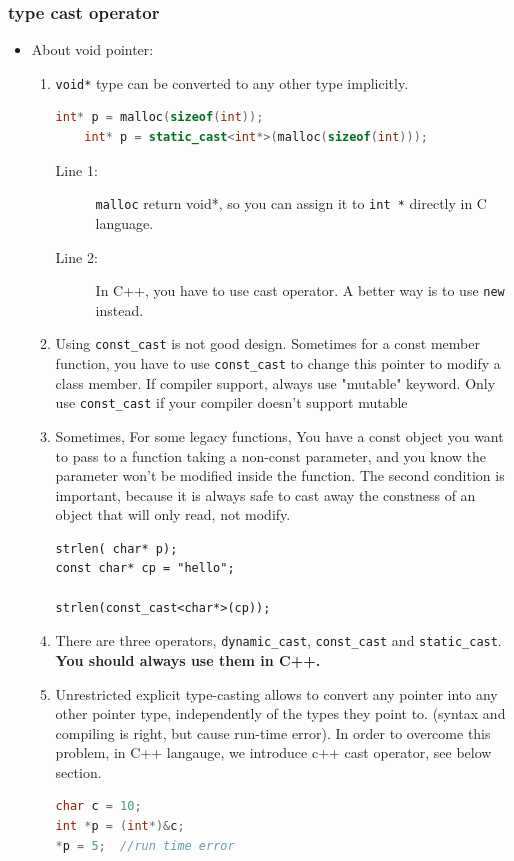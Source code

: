 \documentclass[a4paper,11pt,twoside]{book}
\begin{document}
\subsubsection{type cast operator}
\begin{itemize}
	\item About void pointer:
	\begin{enumerate}
		\item \texttt{void*} type can be converted to any other type implicitly.
\begin{lstlisting}[frame=single, language=c++]
	int* p = malloc(sizeof(int));
	int* p = static_cast<int*>(malloc(sizeof(int)));
\end{lstlisting}		
		\begin{description}
			\item[Line 1:] \texttt{malloc} return void*, so you can assign it to \texttt{int *} directly in C language.
			\item[Line 2:] In C++, you have to use cast operator. A better way is to use \texttt{new} instead.
		\end{description}


	\item Using \texttt{const\_cast} is not good design. Sometimes for a const member function, you have to use \texttt{const\_cast} to change this pointer to modify a class member. If compiler support, always use "mutable"  keyword.  Only use \texttt{const\_cast} if your compiler doesn't support mutable

\item Sometimes, For some legacy functions, You have a const object you want to pass to a function taking a non-const parameter, and you know the parameter won't be modified inside the function. The second condition is important, because it is always safe to cast away the constness of an object that will only read, not modify.

\begin{lstlisting}[numbers = none]
strlen( char* p);
const char* cp = "hello";

strlen(const_cast<char*>(cp));	
\end{lstlisting}
		
		
	\item There are three operators, \texttt{dynamic\_cast}, \texttt{const\_cast} and \texttt{static\_cast}. \textbf{You should always use them in C++.}
	
	\item Unrestricted explicit type-casting allows to convert any pointer into any other pointer type, independently of the types they point to.  (syntax and compiling is right, but cause run-time error). In order to overcome this problem,  in C++ langauge, we introduce c++ cast operator, see below section.
\begin{lstlisting}[frame=single, language=c++]
char c = 10;    
int *p = (int*)&c; 
*p = 5;  //run time error 
	

\end{lstlisting}
\end{enumerate}
\end{itemize}
\end{document}
